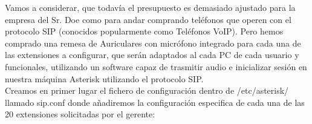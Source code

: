 Vamos a considerar, que todavía el presupuesto es demasiado ajustado para la empresa del Sr. Doe como para andar comprando teléfonos que operen con el protocolo SIP (conocidos popularmente como Teléfonos VoIP). Pero hemos comprado una remesa de Auriculares con micrófono integrado para cada una de las extensiones a configurar, que serán adaptados al cada PC de cada usuario y funcionales, utilizando un software capaz de trasmitir audio e inicializar sesión en nuestra máquina Asterisk utilizando el protocolo SIP.\\

Creamos en primer lugar el fichero de configuración dentro de /etc/asterisk/ llamado sip.conf donde añadiremos la configuración especifica de cada una de las 20 extensiones solicitadas por el gerente:\\

